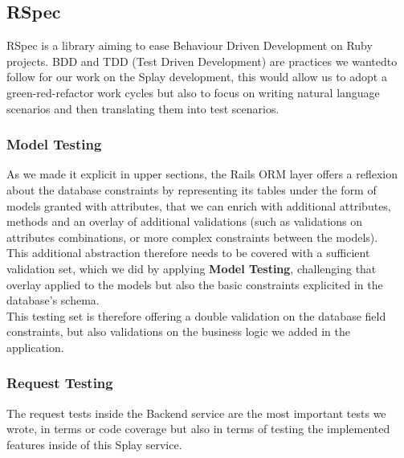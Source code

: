 \documentclass{eplmastersthesis}
\begin{document}
      \subsection{RSpec}

        RSpec \cite{rspec} is a library aiming to ease Behaviour Driven
        Development on Ruby projects. BDD and TDD (Test Driven Development) are
        practices we wantedto follow for our work on the Splay development,
        this would allow us to adopt a green-red-refactor work cycles but also
        to focus on writing natural language scenarios and then translating
        them into test scenarios.

        \subsubsection{Model Testing}

          As we made it explicit in upper sections, the Rails ORM layer offers
          a reflexion about the database constraints by representing its
          tables under the form of models granted with attributes, that we can
          enrich with additional attributes, methods and an overlay of
          additional validations (such as validations on attributes
          combinations, or more complex constraints between the models).\\

          This additional abstraction therefore needs to be covered with a
          sufficient validation set, which we did by applying
          \textbf{Model Testing}, challenging that overlay applied to the
          models but also the basic constraints explicited in the database's
          schema.\\

          This testing set is therefore offering a double validation on the
          database field constraints, but also validations on the business
          logic we added in the application.

        \subsubsection{Request Testing}

          The request tests inside the Backend service are the most important
          tests we wrote, in terms or code coverage but also in terms of
          testing the implemented features inside of this Splay service.\\
\end{document}
